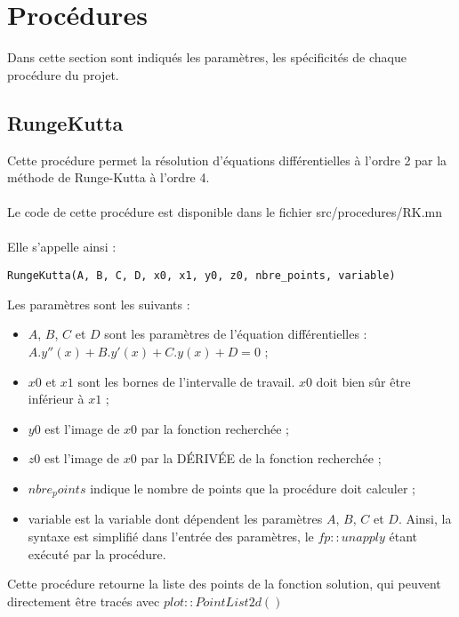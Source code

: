 \documentclass{report}
\begin{document}
\section{Procédures}
Dans cette section sont indiqués les paramètres, les spécificités de chaque procédure du projet.
\subsection{RungeKutta}
Cette procédure permet la résolution d'équations différentielles à l'ordre 2 par la méthode de Runge-Kutta à l'ordre 4.
\\
\\
Le code de cette procédure est disponible dans le fichier src/procedures/RK.mn
\\
\\
Elle s'appelle ainsi :  
\begin{verbatim}
RungeKutta(A, B, C, D, x0, x1, y0, z0, nbre_points, variable)
\end{verbatim}
Les paramètres sont les suivants : 
\begin{itemize}
	\item $A$, $B$, $C$ et $D$ sont les paramètres de l'équation différentielles : $A.y''(x) + B.y'(x) + C.y(x) + D = 0$ ;
	\item $x0$ et $x1$ sont les bornes de l'intervalle de travail. $x0$ doit bien sûr être inférieur à $x1$ ;
	\item $y0$ est l'image de $x0$ par la fonction recherchée ;
	\item $z0$ est l'image de $x0$ par la DÉRIVÉE de la fonction recherchée ;
	\item $nbre_points$ indique le nombre de points que la procédure doit calculer ;
	\item variable est la variable dont dépendent les paramètres $A$, $B$, $C$ et $D$. Ainsi, la syntaxe est simplifié dans l'entrée des paramètres, le $fp::unapply$ étant exécuté par la procédure.
\end{itemize}
Cette procédure retourne la liste des points de la fonction solution, qui peuvent directement être tracés avec $plot::PointList2d()$
\end{document}
